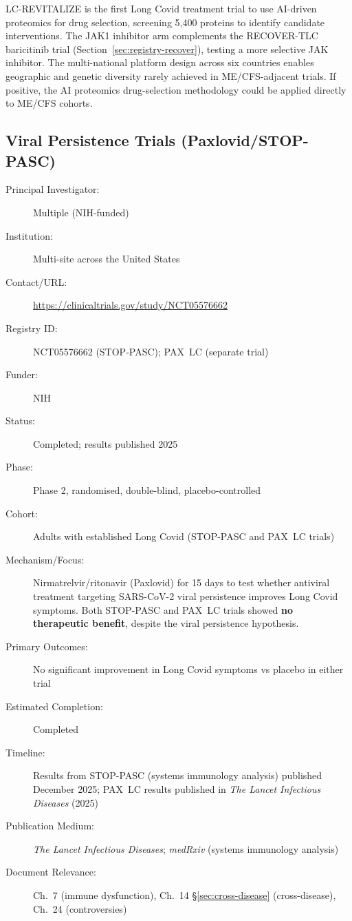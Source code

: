 LC-REVITALIZE is the first Long Covid treatment trial to use AI-driven
proteomics for drug selection, screening 5,400 proteins to identify
candidate interventions.  The JAK1 inhibitor arm complements the RECOVER-TLC
baricitinib trial (Section~\ref{sec:registry-recover}), testing a more
selective JAK inhibitor.  The multi-national platform design across six
countries enables geographic and genetic diversity rarely achieved in
ME/CFS-adjacent trials.  If positive, the AI proteomics drug-selection
methodology could be applied directly to ME/CFS cohorts.

\subsection{Viral Persistence Trials (Paxlovid/STOP-PASC)}
\label{sec:registry-viral-persistence}

\begin{description}
    \item[Principal Investigator:] Multiple (NIH-funded)
    \item[Institution:] Multi-site across the United States
    \item[Contact/URL:] \url{https://clinicaltrials.gov/study/NCT05576662}
    \item[Registry ID:] NCT05576662 (STOP-PASC); PAX~LC (separate trial)
    \item[Funder:] NIH
    \item[Status:] Completed; results published 2025
    \item[Phase:] Phase 2, randomised, double-blind, placebo-controlled
    \item[Cohort:] Adults with established Long Covid (STOP-PASC and PAX~LC
        trials)
    \item[Mechanism/Focus:] Nirmatrelvir/ritonavir (Paxlovid) for 15 days
        to test whether antiviral treatment targeting SARS-CoV-2 viral
        persistence improves Long Covid symptoms.  Both STOP-PASC and
        PAX~LC trials showed \textbf{no therapeutic benefit}, despite
        the viral persistence hypothesis.
    \item[Primary Outcomes:] No significant improvement in Long Covid
        symptoms vs placebo in either trial
    \item[Estimated Completion:] Completed
    \item[Timeline:] Results from STOP-PASC (systems immunology analysis)
        published December 2025; PAX~LC results published in
        \textit{The Lancet Infectious Diseases} (2025)
    \item[Publication Medium:] \textit{The Lancet Infectious Diseases};
        \textit{medRxiv} (systems immunology analysis)
    \item[Document Relevance:] Ch.~7 (immune dysfunction), Ch.~14
        \S\ref{sec:cross-disease} (cross-disease), Ch.~24 (controversies)
\end{description}

